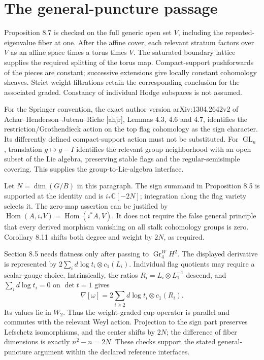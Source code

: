 \documentclass[10pt]{article}
\begin{document}
\section*{The general-puncture passage}
Proposition 8.7 is checked on the full generic open set \(V\), including the repeated-eigenvalue fiber at one. After the affine cover, each relevant stratum factors over \(V\) as an affine space times a torus times \(V\). The saturated boundary lattice supplies the required splitting of the torus map. Compact-support pushforwards of the pieces are constant; successive extensions give locally constant cohomology sheaves. Strict weight filtrations retain the corresponding conclusion for the associated graded. Constancy of individual Hodge subspaces is not assumed.\par
For the Springer convention, the exact author version arXiv:1304.2642v2 of Achar–Henderson–Juteau–Riche [ahjr], Lemmas 4.3, 4.6 and 4.7, identifies the restriction/Grothendieck action on the top flag cohomology as the sign character. Its differently defined compact-support action must not be substituted. For \(\operatorname{GL}_n\), translation \(g\mapsto g-I\) identifies the relevant group neighborhood with an open subset of the Lie algebra, preserving stable flags and the regular-semisimple covering. This supplies the group-to-Lie-algebra interface.\par
Let \(N=\dim(G/B)\) in this paragraph. The sign summand in Proposition 8.5 is supported at the identity and is \(i_*\mathbb C[-2N]\); integration along the flag variety selects it. The zero-map assertion can be justified by \(\operatorname{Hom}(A,i_*V)=\operatorname{Hom}(i^*A,V)\). It does not require the false general principle that every derived morphism vanishing on all stalk cohomology groups is zero. Corollary 8.11 shifts both degree and weight by \(2N\), as required.\par
Section 8.5 needs flatness only after passing to \(\operatorname{Gr}^W_4H^2\). The displayed derivative is represented by \(2\sum_i d\log t_i\otimes c_1(L_i)\). Individual flag quotients may require a scalar-gauge choice. Intrinsically, the ratios \(R_i=L_i\otimes L_1^{-1}\) descend, and \(\sum_i d\log t_i=0\) on \(\det t=1\) gives \[\nabla[\omega]=
 2\sum_{i\ge2}d\log t_i\otimes c_1(R_i).\] Its values lie in \(W_2\). Thus the weight-graded cup operator is parallel and commutes with the relevant Weyl action. Projection to the sign part preserves Lefschetz isomorphisms, and the center shifts by \(2N\); the difference of fiber dimensions is exactly \(n^2-n=2N\). These checks support the stated general-puncture argument within the declared reference interfaces.\par
\end{document}
